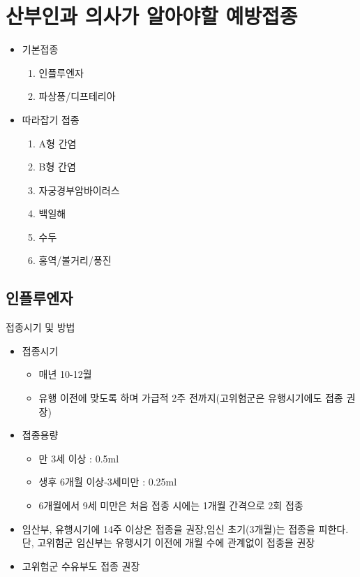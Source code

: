 \section{산부인과 의사가 알아야할 예방접종}
\begin{itemize}\tightlist
\item 기본접종
	\begin{enumerate}\tightlist
	\item 인플루엔자
	\item 파상풍/디프테리아
	\end{enumerate}
\item 따라잡기 접종
	\begin{enumerate}\tightlist
	\item A형 간염
	\item B형 간염
	\item 자궁경부암바이러스
	\item 백일해
	\item 수두
	\item 홍역/볼거리/풍진
	\end{enumerate}
\end{itemize}

\subsection{인플루엔자}
\begin{commentbox}{접종시기 및 방법}
\begin{itemize}\tightlist
\item 접종시기
	\begin{itemize}\tightlist
	\item 매년 10-12월
	\item 유행 이전에 맞도록 하며 가급적 2주 전까지(고위험군은 유행시기에도 접종 권장)
	\end{itemize}
\item 접종용량
	\begin{itemize}\tightlist
	\item 만 3세 이상 : 0.5ml
	\item 생후 6개월 이상-3세미만 : 0.25ml
	\item 6개월에서 9세 미만은 처음 접종 시에는 1개월 간격으로 2회 접종
	\end{itemize}
\item 임산부, 유행시기에 14주 이상은 접종을 권장,임신 초기(3개월)는 접종을 피한다. 단, 고위험군 임신부는 유행시기 이전에 개월 수에 관계없이 접종을 권장
\item 고위험군 수유부도 접종 권장
\end{itemize}
\end{commentbox}
